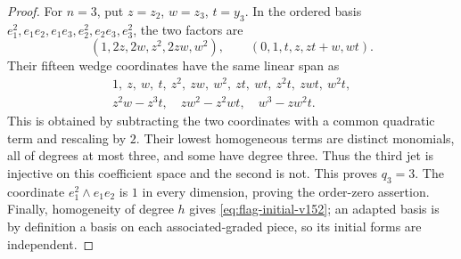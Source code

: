 \documentclass[11pt,reqno]{amsart}
\numberwithin{equation}{section}
\theoremstyle{definition}\newtheorem{definition}[theorem]{Definition}
\theoremstyle{remark}\newtheorem{remark}[theorem]{Remark}
\begin{document}
\begin{proof}
For $n=3$, put $z=z_2$, $w=z_3$, $t=y_3$.  In the ordered basis
$e_1^2,e_1e_2,e_1e_3,e_2^2,e_2e_3,e_3^2$, the two factors are
\[
 (1,2z,2w,z^2,2zw,w^2),\qquad
 (0,1,t,z,zt+w,wt).
\]
Their fifteen wedge coordinates have the same linear span as
\begin{equation}\label{eq:ternary-flag-basis-v152}
\begin{gathered}
 1,\ z,\ w,\ t,\ z^2,\ zw,\ w^2,\ zt,\ wt,\ z^2t,\ zwt,\ w^2t,\\
 z^2w-z^3t,\quad zw^2-z^2wt,\quad w^3-zw^2t.
\end{gathered}
\end{equation}
This is obtained by subtracting the two coordinates with a common
quadratic term and rescaling by $2$.  Their lowest homogeneous terms
are distinct monomials, all of degrees at most three, and some have
degree three.  Thus the third jet is injective on this coefficient
space and the second is not.  This proves $q_3=3$.  The coordinate
$e_1^2\wedge e_1e_2$ is $1$ in every dimension, proving the
order-zero assertion.  Finally, homogeneity of degree $h$ gives
\eqref{eq:flag-initial-v152}; an adapted basis is by definition a
basis on each associated-graded piece, so its initial forms are
independent.
\end{proof}
\end{document}

